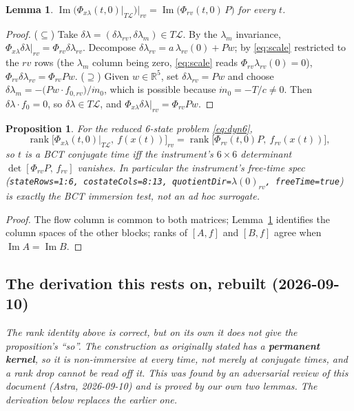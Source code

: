 \documentclass[11pt]{article}
\newtheorem{lemma}{Lemma}
\newtheorem{proposition}{Proposition}
\theoremstyle{definition}
\newcommand{\R}{\mathbb{R}}
\newcommand{\lm}{\lambda_m}
\newcommand{\lrv}{\lambda_{rv}}
\newcommand{\Phixl}{\Phi_{x\lambda}}
\begin{document}
\begin{lemma}\label{lem:image}
$\operatorname{Im}\big(\Phixl(t,0)|_{T\mathcal L}\big)\big|_{rv}
=\operatorname{Im}\big(\Phi_{rv}(t,0)\,P\big)$ for every $t$.
\end{lemma}
\begin{proof}
($\subseteq$) Take $\delta\lambda=(\delta\lrv,\delta\lm)\in T\mathcal L$. By the
$\lm$ invariance, $\Phixl\delta\lambda|_{rv}=\Phi_{rv}\delta\lrv$. Decompose
$\delta\lrv=a\,\lrv(0)+Pw$; by \eqref{eq:scale} restricted to the $rv$ rows
(the $\lm$ column being zero, \eqref{eq:scale} reads $\Phi_{rv}\lrv(0)=0$),
$\Phi_{rv}\delta\lrv=\Phi_{rv}Pw$.
($\supseteq$) Given $w\in\R^5$, set $\delta\lrv=Pw$ and choose
$\delta\lm=-\big(Pw\cdot f_{0,rv}\big)/\dot m_0$, which is possible because
$\dot m_0=-T/c\neq0$. Then $\delta\lambda\cdot f_0=0$, so
$\delta\lambda\in T\mathcal L$, and $\Phixl\delta\lambda|_{rv}=\Phi_{rv}Pw$.
\end{proof}

\begin{proposition}\label{prop:equiv}
For the reduced 6-state problem \eqref{eq:dyn6},
\[
\operatorname{rank}\big[\Phixl(t,0)|_{T\mathcal L},\ f(x(t))\big]_{rv}
=\operatorname{rank}\big[\Phi_{rv}(t,0)P,\ f_{rv}(x(t))\big],
\]
so $t$ is a BCT conjugate time iff the instrument's $6\times6$ determinant
$\det[\Phi_{rv}P,\,f_{rv}]$ vanishes. In particular the instrument's
\emph{free-time spec} (\texttt{stateRows=1:6, costateCols=8:13,
quotientDir=$\lambda(0)_{rv}$, freeTime=true}) is exactly the BCT immersion
test, not an ad hoc surrogate.
\end{proposition}
\begin{proof}
The flow column is common to both matrices; Lemma~\ref{lem:image} identifies
the column spaces of the other blocks; ranks of $[A,f]$ and $[B,f]$ agree when
$\operatorname{Im}A=\operatorname{Im}B$.
\end{proof}

\subsection*{The derivation this rests on, rebuilt (2026-09-10)}
\emph{The rank identity above is correct, but on its own it does not give the
proposition's ``so''. The construction as originally stated has a
\textbf{permanent kernel}, so it is non-immersive at every time, not merely at
conjugate times, and a rank drop cannot be read off it. This was found by an
adversarial review of this document (Astra, 2026-09-10) and is proved by our
own two lemmas. The derivation below replaces the earlier one.}
\end{document}
